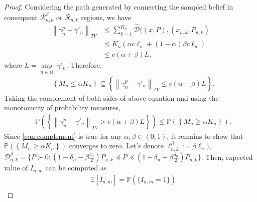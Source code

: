 \documentclass[Afour,sageh,times]{sagej}
\begin{document}
\begin{proof}
Considering the path generated by connecting the sampled belief in consequent $\mathcal{R}^\beta_{n,k}$ or $\mathcal{R}_{n,k}$ regions, we have 
\begin{align}
\left\|\gamma^p_{n}-\gamma'_{n}\right\|_{TV}& \leq  \sum_{k=1}^{K_n}  \hat{\mathcal{D}}((x,P), (x_{n,k},P_{n,k})\nonumber\\
&\leq K_n (\alpha c \ell_n + (1-\alpha) \beta c \ell_n) \nonumber\\
&\leq c(\alpha+\beta) L,
\end{align}
where { $L=\underset{n\in\mathbb{N}}{\sup}\;\gamma'_n$}. Therefore,  
\begin{align}
&\left\{M_{n} \leq \alpha K_{n}\right\} \subseteq
\left\{\left\|\gamma^p_{n}-\gamma'_{n}\right\|_{TV} \leq c(\alpha+\beta) L \right\}\nonumber.
\end{align}
Taking the complement of both sides of above equation and using the monotonicity of probability measures,
\begin{align}
&\mathbb{P}\left(\!\left\{\left\|\gamma^p_{n}-\gamma'_{n}\right\|_{TV}\!>\! c(\alpha+\beta) L \right\}\!\right)
\!\leq\!\mathbb{P}\left(\!\left\{M_{n} \!\geq\! \alpha K_{n}\right\}\!\right).
\label{eqn:complement}
\end{align}
Since \eqref{eqn:complement} is true for any $\alpha,\beta\in(0,1)$, it remains to show that $\mathbb{P}\left(\left\{M_{n} \geq \alpha K_{n}\right\}\right) $ converges to zero. 
Let's denote $\ell^\beta_{ n,k}:=\beta \ell_n)$, $\mathcal{D}^\beta_{n,k}= \{ P\succ 0: {(1-\delta_n-\beta \frac{\delta_n}{2})}P_{n,k}\preceq P \preceq  (1-\delta_n+\beta \frac{\delta_n}{2}) P_{n,k}\}$. Then, expected value of $I_{n,m}$ can be computed as 
\begin{align}
    &\mathbb{E}[I_{n,m}]
    = \mathbb{P}(\{I_{n,m}=1\}) \nonumber\\

\end{align}
\end{proof}
\end{document}
